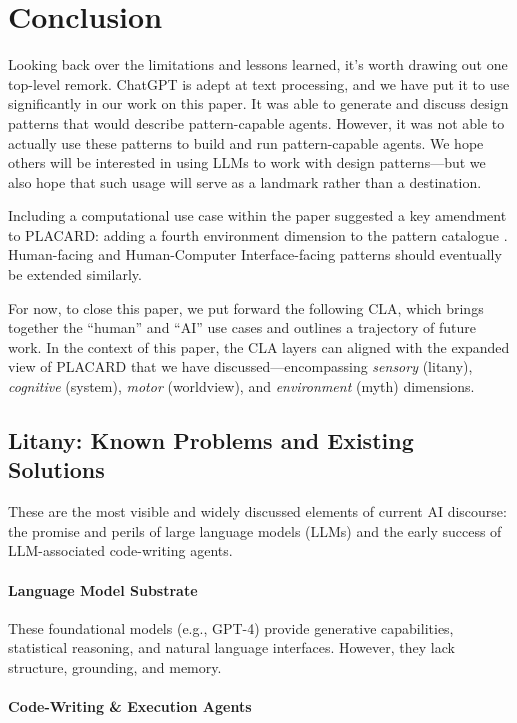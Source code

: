 \documentclass[acmlarge,timestamp]{acmart}
\begin{document}
\section{Conclusion}\label{sec:conclusion}

Looking back over the limitations and lessons learned, it’s worth
drawing out one top-level remork.  ChatGPT is adept at text
processing, and we have put it to use significantly in our work on
this paper.  It was able to generate and discuss design patterns that
would describe pattern-capable agents.  However, it was not able to
actually use these patterns to build and run pattern-capable agents.
We hope others will be interested in using LLMs to work with design
patterns—but we also hope that such usage will serve as a landmark
rather than a destination.

Including a computational use case within the paper suggested a key
amendment to PLACARD: adding a fourth environment dimension to the
pattern catalogue . Human-facing and Human-Computer Interface-facing
patterns should eventually be extended similarly.

For now, to close this paper, we put forward the following CLA, which
brings together the ``human'' and ``AI'' use cases and outlines a
trajectory of future work.  In the context of this paper, the CLA
layers can aligned with the expanded view of PLACARD that we have
discussed—encompassing \emph{sensory} (litany), \emph{cognitive}
(system), \emph{motor} (worldview), and \emph{environment} (myth)
dimensions.

\subsection*{ Litany: Known Problems and Existing Solutions}

These are the most visible and widely discussed elements of current AI
discourse: the promise and perils of large language models (LLMs) and
the early success of LLM-associated code-writing agents.

\paragraph{Language Model Substrate}

These foundational models (e.g., GPT-4) provide generative
capabilities, statistical reasoning, and natural language interfaces.
However, they lack structure, grounding, and memory.

\paragraph{Code-Writing \& Execution Agents}
\end{document}
